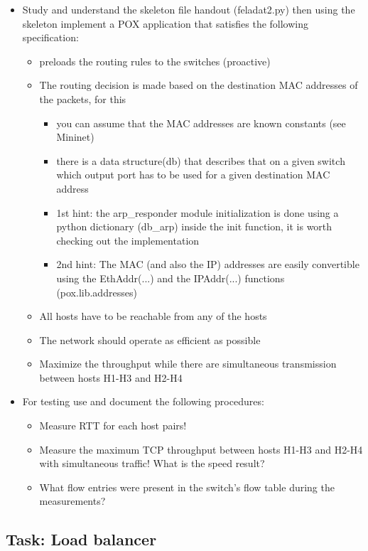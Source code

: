 \documentclass[a4paper]{article}
\begin{document}
\begin{itemize}
\item Study and understand the  skeleton file handout (feladat2.py) then using the skeleton implement a POX application that satisfies the following
specification:
\begin{itemize}
\item        preloads the routing rules to the switches (proactive)
\item        The routing decision is made based on the destination MAC addresses of the packets, for this 
\begin{itemize}
\item            you can assume that the MAC addresses are known constants (see Mininet)
\item            there is a data structure(db) that describes that on a given switch which output port has to be used for a given destination MAC address
\item            1st hint: the arp\_responder module initialization is done using a python dictionary (db\_arp) inside the init function, it is worth checking out the implementation
\item            2nd hint: The MAC (and also the IP) addresses are easily convertible using the EthAddr(...) and the IPAddr(...) functions (pox.lib.addresses) 
\end{itemize}
\item        All hosts have to be reachable from any of the hosts
\item        The network should operate as efficient as possible
\item        Maximize the throughput while there are simultaneous transmission between hosts H1-H3 and H2-H4 
\end{itemize}

\item For testing use and document the following procedures:
\begin{itemize}
\item        Measure RTT for each host pairs!
\item        Measure the maximum TCP throughput between hosts H1-H3 and H2-H4 with simultaneous traffic! What is the speed result?
\item        What flow entries were present in the switch's flow table during the measurements?
\end{itemize}
\end{itemize}

\subsection{Task: Load balancer} \label{task:loadbalancer}
\end{document}
